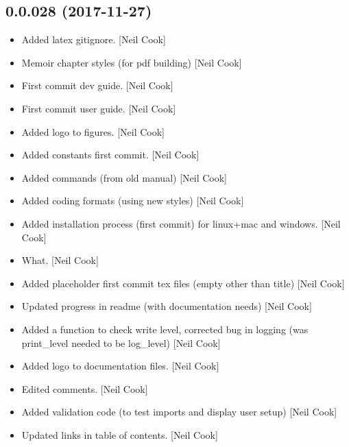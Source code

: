 \documentclass[a4paper,10pt,english]{report}
\begin{document}
\subsection{0.0.028 (2017-11-27)}
\label{\detokenize{misc/changelog:id522}}\begin{itemize}
\item {} 
Added latex gitignore. {[}Neil Cook{]}

\item {} 
Memoir chapter styles (for pdf building) {[}Neil Cook{]}

\item {} 
First commit dev guide. {[}Neil Cook{]}

\item {} 
First commit user guide. {[}Neil Cook{]}

\item {} 
Added logo to figures. {[}Neil Cook{]}

\item {} 
Added constants first commit. {[}Neil Cook{]}

\item {} 
Added commands (from old manual) {[}Neil Cook{]}

\item {} 
Added coding formats (using new styles) {[}Neil Cook{]}

\item {} 
Added installation process (first commit) for linux+mac and windows.
{[}Neil Cook{]}

\item {} 
What. {[}Neil Cook{]}

\item {} 
Added placeholder first commit tex files (empty other than title)
{[}Neil Cook{]}

\item {} 
Updated progress in readme (with documentation needs) {[}Neil Cook{]}

\item {} 
Added a function to check write level, corrected bug in logging (was
print\_level needed to be log\_level) {[}Neil Cook{]}

\item {} 
Added logo to documentation files. {[}Neil Cook{]}

\item {} 
Edited comments. {[}Neil Cook{]}

\item {} 
Added validation code (to test imports and display user setup) {[}Neil
Cook{]}

\item {} 
Updated links in table of contents. {[}Neil Cook{]}

\end{itemize}
\end{document}
